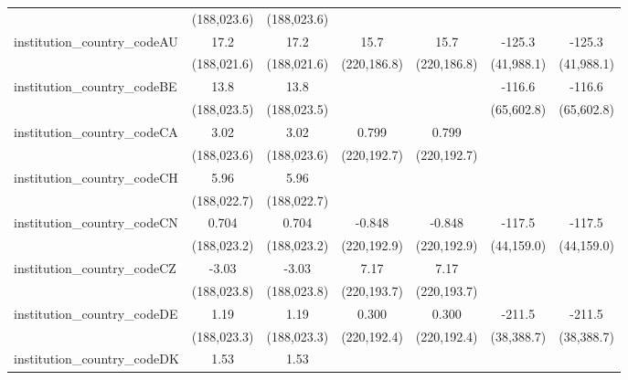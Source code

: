\begin{tabular}{lcccccc}
                                         & (188,023.6)   & (188,023.6)   &               &               &              &   \\   
   institution\_country\_codeAU          & 17.2          & 17.2          & 15.7          & 15.7          & -125.3       & -125.3\\   
                                         & (188,021.6)   & (188,021.6)   & (220,186.8)   & (220,186.8)   & (41,988.1)   & (41,988.1)\\   
   institution\_country\_codeBE          & 13.8          & 13.8          &               &               & -116.6       & -116.6\\   
                                         & (188,023.5)   & (188,023.5)   &               &               & (65,602.8)   & (65,602.8)\\   
   institution\_country\_codeCA          & 3.02          & 3.02          & 0.799         & 0.799         &              &   \\   
                                         & (188,023.6)   & (188,023.6)   & (220,192.7)   & (220,192.7)   &              &   \\   
   institution\_country\_codeCH          & 5.96          & 5.96          &               &               &              &   \\   
                                         & (188,022.7)   & (188,022.7)   &               &               &              &   \\   
   institution\_country\_codeCN          & 0.704         & 0.704         & -0.848        & -0.848        & -117.5       & -117.5\\   
                                         & (188,023.2)   & (188,023.2)   & (220,192.9)   & (220,192.9)   & (44,159.0)   & (44,159.0)\\   
   institution\_country\_codeCZ          & -3.03         & -3.03         & 7.17          & 7.17          &              &   \\   
                                         & (188,023.8)   & (188,023.8)   & (220,193.7)   & (220,193.7)   &              &   \\   
   institution\_country\_codeDE          & 1.19          & 1.19          & 0.300         & 0.300         & -211.5       & -211.5\\   
                                         & (188,023.3)   & (188,023.3)   & (220,192.4)   & (220,192.4)   & (38,388.7)   & (38,388.7)\\   
   institution\_country\_codeDK          & 1.53          & 1.53          &               &               &              &   \\   

\end{tabular}
